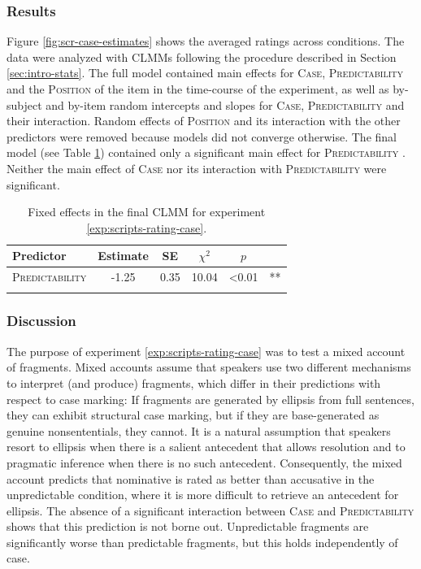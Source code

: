 \subsubsection{Results}
Figure \ref{fig:scr-case-estimates} shows the averaged ratings across conditions. The data were analyzed with CLMMs following the procedure described in Section \ref{sec:intro-stats}. The full model contained main effects for \textsc{Case}, \textsc{Predictability} and the \textsc{Position} of the item in the time-course of the experiment, as well as by-subject and by-item random intercepts and slopes for \textsc{Case}, \textsc{Predictability} and their interaction. Random effects of \textsc{Position} and its interaction with the other predictors were removed because models did not converge otherwise. The final model (see Table \ref{tab:scripts-case-estimates}) contained only a significant main effect for \textsc{Predictability} . Neither the main effect of \textsc{Case}  nor its interaction with \textsc{Predictability}  were significant.\largerpage

\begin{table}
\begin{tabular}{lccccc}
\lsptoprule
Predictor & Estimate & SE & $\chi^2$ &  $p$ &  \\   
\midrule
\textsc{Predictability} & -1.25 &  0.35 & 10.04 & \textless 0.01 & ** \\
\lspbottomrule
\end{tabular}
\caption{Fixed effects in the final CLMM for experiment \ref{exp:scripts-rating-case}. \label{tab:scripts-case-estimates}}
\end{table}

\subsubsection{Discussion}
The purpose of experiment \ref{exp:scripts-rating-case} was to test a mixed account of fragments. Mixed accounts assume that speakers use two different mechanisms to interpret (and produce) fragments, which differ in their predictions with respect to case marking: If fragments are generated by ellipsis from full sentences, they can exhibit structural case marking, but if they are base-generated as genuine nonsententials, they cannot. It is a natural assumption that speakers resort to ellipsis when there is a salient antecedent that allows resolution and to pragmatic inference when there is no such antecedent. Consequently, the mixed account predicts that nominative is rated as better than accusative in the unpredictable condition, where it is more difficult to retrieve an antecedent for ellipsis. The absence of a significant interaction between \textsc{Case} and \textsc{Predictability} shows that this prediction is not borne out. Unpredictable fragments are significantly worse than predictable fragments, but this holds independently of case.

